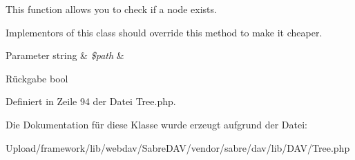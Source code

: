 This function allows you to check if a node exists.

Implementors of this class should override this method to make it cheaper.


\begin{DoxyParams}[1]{Parameter}
string & {\em \$path} & \\
\hline
\end{DoxyParams}
\begin{DoxyReturn}{Rückgabe}
bool 
\end{DoxyReturn}


Definiert in Zeile 94 der Datei Tree.\+php.



Die Dokumentation für diese Klasse wurde erzeugt aufgrund der Datei\+:\begin{DoxyCompactItemize}
\item 
Upload/framework/lib/webdav/\+Sabre\+D\+A\+V/vendor/sabre/dav/lib/\+D\+A\+V/Tree.\+php\end{DoxyCompactItemize}
